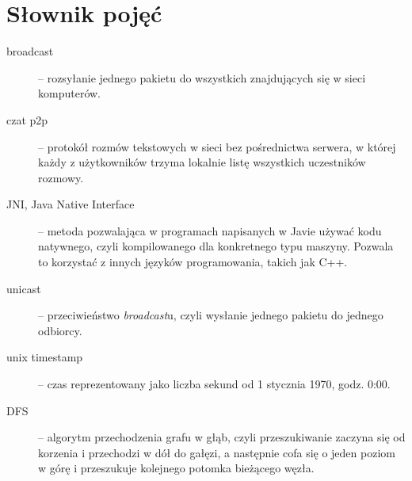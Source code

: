 \documentclass[11pt,leqno]{article}
\begin{document}

\section{Słownik pojęć} \label{sec:dictionary}

\begin{description}
	\item[broadcast] -- rozsyłanie jednego pakietu do wszystkich znajdujących się w sieci
	komputerów.
	\item[czat p2p] -- protokół rozmów tekstowych w sieci bez pośrednictwa serwera, w której każdy
	z użytkowników trzyma lokalnie listę wszystkich uczestników rozmowy.
	\item[JNI, Java Native Interface] -- metoda pozwalająca w programach napisanych w Javie używać
	kodu natywnego, czyli kompilowanego dla konkretnego typu maszyny. Pozwala to korzystać z innych
	języków programowania, takich jak C++.
	\item[unicast] -- przeciwieństwo \textit{broadcast}u, czyli wysłanie jednego pakietu do jednego
	odbiorcy.
	\item[unix timestamp] -- czas reprezentowany jako liczba sekund od 1 stycznia 1970, godz. 0:00.
	\item[DFS] -- algorytm przechodzenia grafu w głąb, czyli przeszukiwanie zaczyna się
	od korzenia i przechodzi w dół do gałęzi, a następnie cofa się o jeden poziom w górę
	i przeszukuje kolejnego potomka bieżącego węzła.
\end{description}
\end{document}
